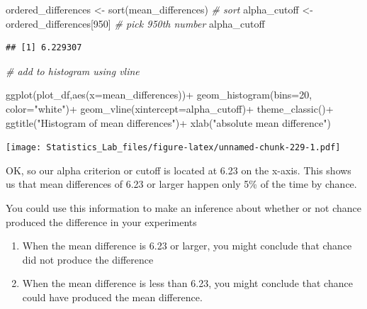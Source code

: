 \documentclass[
]{book}
\newenvironment{Shaded}{\begin{snugshade}}{\end{snugshade}}
\newcommand{\AttributeTok}[1]{\textcolor[rgb]{0.77,0.63,0.00}{#1}}
\newcommand{\CommentTok}[1]{\textcolor[rgb]{0.56,0.35,0.01}{\textit{#1}}}
\newcommand{\DecValTok}[1]{\textcolor[rgb]{0.00,0.00,0.81}{#1}}
\newcommand{\FunctionTok}[1]{\textcolor[rgb]{0.00,0.00,0.00}{#1}}
\newcommand{\NormalTok}[1]{#1}
\newcommand{\OtherTok}[1]{\textcolor[rgb]{0.56,0.35,0.01}{#1}}
\newcommand{\SpecialCharTok}[1]{\textcolor[rgb]{0.00,0.00,0.00}{#1}}
\newcommand{\StringTok}[1]{\textcolor[rgb]{0.31,0.60,0.02}{#1}}
\begin{document}
\begin{Shaded}
\begin{Highlighting}[]
\NormalTok{ordered\_differences }\OtherTok{\textless{}{-}} \FunctionTok{sort}\NormalTok{(mean\_differences) }\CommentTok{\# sort}
\NormalTok{alpha\_cutoff }\OtherTok{\textless{}{-}}\NormalTok{ ordered\_differences[}\DecValTok{950}\NormalTok{] }\CommentTok{\# pick 950th number}
\NormalTok{alpha\_cutoff}
\end{Highlighting}
\end{Shaded}

\begin{verbatim}
## [1] 6.229307
\end{verbatim}

\begin{Shaded}
\begin{Highlighting}[]
\CommentTok{\# add to histogram using vline}

\FunctionTok{ggplot}\NormalTok{(plot\_df,}\FunctionTok{aes}\NormalTok{(}\AttributeTok{x=}\NormalTok{mean\_differences))}\SpecialCharTok{+}
  \FunctionTok{geom\_histogram}\NormalTok{(}\AttributeTok{bins=}\DecValTok{20}\NormalTok{, }\AttributeTok{color=}\StringTok{"white"}\NormalTok{)}\SpecialCharTok{+}
  \FunctionTok{geom\_vline}\NormalTok{(}\AttributeTok{xintercept=}\NormalTok{alpha\_cutoff)}\SpecialCharTok{+}
  \FunctionTok{theme\_classic}\NormalTok{()}\SpecialCharTok{+}
  \FunctionTok{ggtitle}\NormalTok{(}\StringTok{"Histogram of mean differences"}\NormalTok{)}\SpecialCharTok{+}
  \FunctionTok{xlab}\NormalTok{(}\StringTok{"absolute mean difference"}\NormalTok{)}
\end{Highlighting}
\end{Shaded}

\texttt{[image: Statistics\_Lab\_files/figure-latex/unnamed-chunk-229-1.pdf]}

OK, so our alpha criterion or cutoff is located at 6.23 on the x-axis. This shows us that mean differences of 6.23 or larger happen only 5\% of the time by chance.

You could use this information to make an inference about whether or not chance produced the difference in your experiments

\begin{enumerate}
\def\labelenumi{\arabic{enumi}.}
\item
  When the mean difference is 6.23 or larger, you might conclude that chance did not produce the difference
\item
  When the mean difference is less than 6.23, you might conclude that chance could have produced the mean difference.
\end{enumerate}
\end{document}
